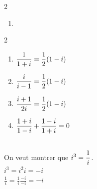 \begin{solution}
\begin{multicols}{2}
\begin{enumerate}[label=(\alph*)]
        \item \begin{minipage}{.4\textwidth}
        \end{minipage}
    \end{enumerate}
    \end{multicols}
\end{solution}

\begin{solution}
    \textbf{ }
    \begin{multicols}{2}
    \begin{enumerate}[label=(\alph*)]
        \item $\displaystyle \frac1{1+i} = \frac{1}{2} (1-i)$
        \item $\displaystyle \frac{i}{i-1} = \frac{1}{2} (1-i)$
        \item $\displaystyle \frac{i+1}{2i} = \frac{1}{2} (1-i)$
        \item $\displaystyle \frac{1+i}{1-i} + \frac{1-i}{1+i} = 0$
    \end{enumerate}
    \end{multicols}
\end{solution}

\begin{solution}
    \textbf{ } \\
    On veut montrer que $\displaystyle i^3 = \frac1i$.\\
    $i^3 = i^2 i = -i$ \\
    $\frac1i = \frac1i \frac{-i}{-i} = -i$

\end{solution}

